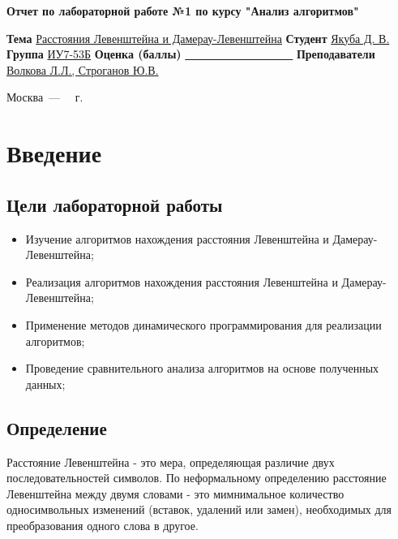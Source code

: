 \documentclass[12pt]{report}
\begin{document}
\begin{titlepage}
	
	\begin{center}
		\Large\textbf{Отчет по лабораторной работе №1 по курсу "Анализ алгоритмов"}\newline
	\end{center}
	
	\noindent\textbf{Тема} \underline{Расстояния Левенштейна и Дамерау-Левенштейна}\newline\newline\newline
	\noindent\textbf{Студент} \underline{Якуба Д. В.}\newline\newline
	\noindent\textbf{Группа} \underline{ИУ7-53Б}\newline\newline
	\noindent\textbf{Оценка (баллы)} \underline{~~~~~~~~~~~~~~~~~~~}\newline\newline
	\noindent\textbf{Преподаватели} \underline{Волкова Л.Л., Строганов Ю.В.}\newline
	
	\begin{center}
		\vfill
		Москва~---~\the\year
		~г.
	\end{center}
\end{titlepage}

\tableofcontents

\newpage
\chapter*{Введение}
\section*{Цели лабораторной работы}
\begin{itemize}
\item Изучение алгоритмов нахождения расстояния Левенштейна и Дамерау-Левенштейна;
\item Реализация алгоритмов нахождения расстояния Левенштейна и Дамерау-Левенштейна;
\item Применение методов динамического программирования для реализации алгоритмов;
\item Проведение сравнительного анализа алгоритмов на основе полученных данных;
\end{itemize}
\section*{Определение}
Расстояние Левенштейна - это мера, определяющая различие двух последовательностей символов. По неформальному определению расстояние Левенштейна между двумя словами - это мимнимальное количество односимвольных изменений (вставок, удалений или замен), необходимых для преобразования одного слова в другое.
\end{document}
